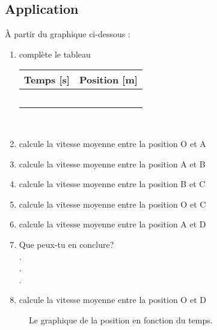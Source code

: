 \subsection{Application}
À partir du graphique ci-dessous :
\begin{enumerate}
    \item complète le tableau \\
          \renewcommand{\arraystretch}{1.5}
          \begin{tabularx}{.8\linewidth}{|X|X|}
              \hline
              Temps [s] & Position [m] \\
              \hline
                        &              \\
              \hline
                        &              \\
              \hline
                        &              \\
              \hline
                        &              \\
              \hline
                        &              \\
              \hline
          \end{tabularx}
          \renewcommand{\arraystretch}{1}
          \\
    \item calcule la vitesse moyenne entre la position O et A \dotfill
    \item calcule la vitesse moyenne entre la position A et B \dotfill
    \item calcule la vitesse moyenne entre la position B et C \dotfill
    \item calcule la vitesse moyenne entre la position O et C \dotfill
    \item calcule la vitesse moyenne entre la position A et D \dotfill
    \item Que peux-tu en conclure? \dotfill \\
          . \dotfill \\
          . \dotfill \\
          . \dotfill
    \item calcule la vitesse moyenne entre la position O et D \dotfill
\end{enumerate}

\newpage
\begin{figure}[h!]
    \centering
    \resizebox{\linewidth}{!}{}
    \caption{Le graphique de la position en fonction du temps.}
    \label{exercice_deplacement}
\end{figure}

